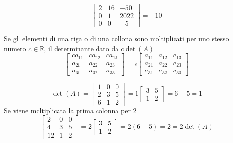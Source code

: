 \begin{es}
  \label{es:prodeldet2}
  \begin{equation*}
    \begin{bmatrix}
      2 & 16 & -50\\
      0 & 1 & 2022\\
      0 & 0 & -5
    \end{bmatrix}=-10
  \end{equation*}
\end{es}
\begin{pro}
  \label{pro:prodeldet3}
  Se gli elementi di una riga o di una collona sono moltiplicati per uno
  stesso numero $c\in\mathds{R}$, il determinante dato da $c\det (A)$
  \begin{equation*}
    \begin{bmatrix}
      ca_{11}& ca_{12} & ca_{13}\\
      a_{21} & a_{22} & a_{23}\\
      a_{31} & a_{32} & a_{33}
    \end{bmatrix}=c
    \begin{bmatrix}
      a_{11} & a_{12} & a_{13}\\
      a_{21} & a_{22} & a_{23}\\
      a_{31} & a_{32} & a_{33}
    \end{bmatrix}
  \end{equation*}
\end{pro}
\begin{es}
  \label{es:prodeldet3}
  \begin{equation*}
    \det(A)=
    \begin{bmatrix}
      1 & 0 & 0\\
      2 & 3 & 5\\
      6 & 1 & 2
    \end{bmatrix}=1
    \begin{bmatrix}
      3 & 5\\
      1 & 2
    \end{bmatrix}=6-5=1
  \end{equation*}
  Se viene moltiplicata la prima colonna per 2
  \begin{equation*}
    \begin{bmatrix}
      2 & 0 & 0\\
      4 & 3 & 5\\
      12 & 1 & 2
    \end{bmatrix}=2
    \begin{bmatrix}
      3 & 5\\
      1 & 2
    \end{bmatrix}=2(6-5)=2 =2\det(A)
  \end{equation*}
\end{es}
